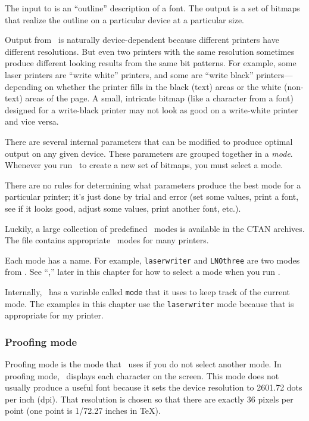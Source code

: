 The input to \MF{} is 
an ``outline'' description of a font.  The output is
a set of bitmaps that realize the outline on a particular device
at a particular size.  

Output from \MF\ is naturally device-dependent because different
printers have different resolutions.  But even two printers with
the same resolution sometimes produce different looking results from the 
same bit patterns.
For example, some laser
printers are ``write white'' printers, and some are ``write black''
printers---depending on whether the printer fills in the black (text)
areas or the white (non-text) areas of the page.  A small, intricate bitmap
(like a character from a font) designed for a write-black printer
may not look as good on a write-white printer and vice versa.

There are several internal parameters that can be modified to produce
optimal output on any given device.  These parameters are grouped together
in a \emph{mode}.  Whenever you run \MF\ to create a new set of bitmaps, 
you must select a mode. 

There are no rules for determining what parameters produce the best
mode for a particular printer; it's just done by trial and error (set
some values, print a font, see if it looks good, adjust some values,
print another font, etc.).

Luckily, a large collection of predefined \MF\ modes is available in the 
CTAN archives. The file  contains 
appropriate \MF\ modes for many printers.

Each mode has a name. 
For example, \verb|laserwriter| and
\verb|LNOthree| are two modes from .  See
``,'' later in this chapter for
how to select a mode when you run \MF.

Internally, \MF\ has a variable called \verb|mode| that it uses
to keep track of the current mode.  The examples in this chapter
use the \verb|laserwriter| mode because that is appropriate for my
printer.  


\subsubsection{Proofing mode}

Proofing mode is the 
mode that \MF\ uses if you do not select another
mode.  In proofing mode, \MF\ displays each character on the screen.
This mode does not usually produce a useful font because it
 sets the device resolution to 2601.72 dots per inch (dpi).  That
resolution is chosen so that there are exactly 36 pixels per point
(one point is 1/72.27 inches in \TeX).

